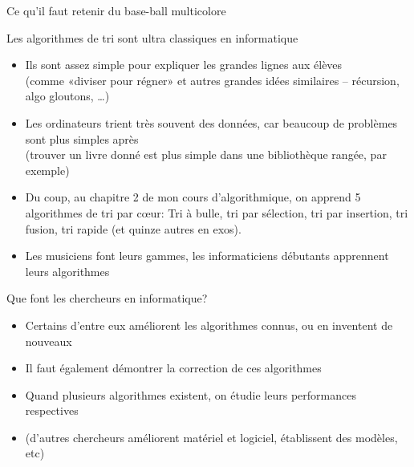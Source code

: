 \documentclass[final,hyperref={pdfpagelabels=false}]{beamer}
\begin{document}
\begin{frame}{Ce qu'il faut retenir du base-ball multicolore}
  \begin{block}{Les algorithmes de tri sont ultra classiques en informatique}
    \begin{itemize}
    \item Ils sont assez simple pour expliquer les grandes lignes aux élèves\\
      (comme «diviser pour régner» et autres grandes idées similaires --
      récursion, algo gloutons, \ldots)
    \item Les ordinateurs trient très souvent des données, car
      beaucoup de problèmes sont plus simples après\\
      (trouver un livre donné est plus simple dans une bibliothèque rangée, par exemple)
    \item Du coup, au chapitre 2 de mon cours d'algorithmique, on apprend 5
      algorithmes de tri par cœur: Tri à bulle, tri par sélection, tri par
      insertion, tri fusion, tri rapide (et quinze autres en exos).
    \item \alert{Les musiciens font leurs gammes, les informaticiens débutants
      apprennent leurs algorithmes}
    \end{itemize}
  \end{block}

  \begin{block}{Que font les chercheurs en informatique?}
    \begin{itemize}
    \item Certains d'entre eux améliorent les algorithmes connus, ou en
      inventent de nouveaux
    \item Il faut également démontrer la correction de ces algorithmes
    \item Quand plusieurs algorithmes existent, on étudie leurs \alert{performances} respectives
    \item (d'autres chercheurs améliorent matériel et logiciel, établissent des
      modèles, etc)
    \end{itemize}
  \end{block}

\end{frame}
\end{document}
